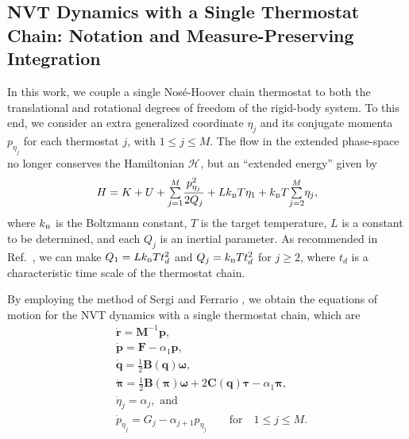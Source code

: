 \documentclass[
journal=jctcce,
layout=twocolumn
]{achemso}
\newcommand{\mt}[1]{\boldsymbol{\mathbf{#1}}}   %
\newcommand{\vt}[1]{\boldsymbol{\mathbf{#1}}}   %
\newcommand{\Ham}[1]{{\mathcal H}_\text{#1}}    %
\begin{document}
\subsection{NVT Dynamics with a Single Thermostat Chain: Notation and Measure-Preserving Integration}
\label{sec:nvt}
In this work, we couple a single Nos\'{e}-Hoover chain thermostat \cite{Martyna_1992} to both the translational and rotational degrees of freedom of the rigid-body system.
To this end, we consider an extra generalized coordinate $\eta_j$ and its conjugate momenta $p_{\eta_j}$ for each thermostat $j$, with $1 \leq j \le M$.
The flow in the extended phase-space no longer conserves the Hamiltonian $\Ham{}$, but an ``extended energy'' given by \cite{Martyna_1992}
\begin{equation}
\label{eq:nvt extended energy}
H = K + U + {\textstyle\sum\limits_{j=1}^{M}} \frac{p_{\eta_j}^2}{2Q_j} + L k_\text{\tiny B} T\eta_1 + k_\text{\tiny B} T {\textstyle\sum\limits_{j=2}^{M}} \eta_j,
\end{equation}
where $k_\text{\tiny B}$ is the Boltzmann constant, $T$ is the target temperature, $L$ is a constant to be determined, and each $Q_j$ is an inertial parameter.
As recommended in Ref.~, we can make $Q_1 = L k_\text{\tiny B} T t_d^2$ and $Q_j = k_\text{\tiny B} T t_d^2$ for $j \geq 2$, where $t_d$ is a characteristic time scale of the thermostat chain.

By employing the method of Sergi and Ferrario \cite{Sergi_2001}, we obtain the equations of motion for the NVT dynamics with a single thermostat chain, which are
\begin{subequations}
	\label{eq:ODE system for NVT}
	\begin{align}
\label{eq:nhc_r}
	&\dot{\vt r} =
	{\mt M}^{-1} {\vt p}, \\
%
\label{eq:nhc_p} 
	&\dot{\vt p} =
	{\vt F} - \alpha_1 {\vt p},\\
%
\label{eq:nhc_q}
	&\dot{\vt q} =
	\frac{1}{2} \mt B(\vt q) \vt \omega, \\
%
\label{eq:nhc_pi}
	&\dot{\vt \pi} =
	\frac{1}{2} \mt B(\vt \pi) \vt \omega + 2 \mt C(\vt q) \vt \tau - \alpha_1 {\vt \pi}, \\
%
\label{eq:nhc_eta}
	&\dot{\eta}_j = \alpha_j, \text{ and} \\
%
\label{eq:nhc_p_eta}
	&{\dot p}_{\eta_j} = G_j - \alpha_{j+1} p_{\eta_j} \qquad \text{for} \quad 1 \leq j \le M.
	\end{align}
\end{subequations}
\end{document}
